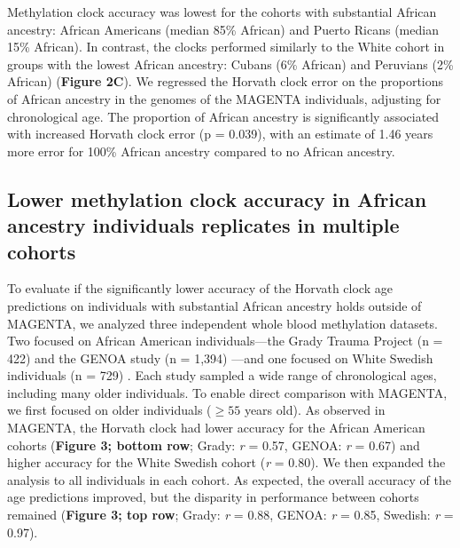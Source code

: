 Methylation clock accuracy was lowest for the cohorts with substantial African ancestry: African Americans (median 85\% African) and Puerto Ricans (median 15\% African). In contrast, the clocks performed similarly to the White cohort in groups with the lowest African ancestry: Cubans (6\% African) and Peruvians (2\% African) (\textbf{Figure 2C}). We regressed the Horvath clock error on the proportions of African ancestry in the genomes of the MAGENTA individuals, adjusting for chronological age. The proportion of African ancestry is significantly associated with increased Horvath clock error (p = 0.039), with an estimate of 1.46 years more error for 100\% African ancestry compared to no African ancestry.

\subsection{Lower methylation clock accuracy in African ancestry individuals replicates in multiple cohorts}
To evaluate if the significantly lower accuracy of the Horvath clock age predictions on individuals with substantial African ancestry holds outside of MAGENTA, we analyzed three independent whole blood methylation datasets. Two focused on African American individuals---the Grady Trauma Project (n = 422) \citep{katrinli_epigenome-wide_2024} and the GENOA study (n = 1,394) \citep{shang_meqtl_2023}---and one focused on White Swedish individuals (n = 729) \citep{johansson_continuous_2013}. Each study sampled a wide range of chronological ages, including many older individuals. To enable direct comparison with MAGENTA, we first focused on older individuals ($\geq 55$ years old). As observed in MAGENTA, the Horvath clock had lower accuracy for the African American cohorts (\textbf{Figure 3; bottom row}; Grady: \textit{r} = 0.57, GENOA: \textit{r} = 0.67) and higher accuracy for the White Swedish cohort (\textit{r} = 0.80). We then expanded the analysis to all individuals in each cohort. As expected, the overall accuracy of the age predictions improved, but the disparity in performance between cohorts remained (\textbf{Figure 3; top row}; Grady: \textit{r} = 0.88, GENOA: \textit{r} = 0.85, Swedish: \textit{r} = 0.97).

\magentareplication


